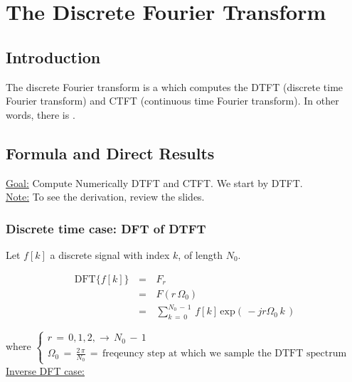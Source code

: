 \documentclass[12pt,a4paper]{book}
\begin{document}
\chapter{The Discrete Fourier Transform}

\section{Introduction}

The discrete Fourier transform is a  which computes the DTFT (discrete time Fourier transform) and CTFT (continuous time Fourier transform). In other words, there is .


\section{Formula and Direct Results}

\underline{Goal:} Compute Numerically DTFT and CTFT. We start by DTFT.\\

\underline{Note:} To see the derivation, review the slides.


\subsection{Discrete time case: DFT of DTFT}

Let $f[k]$ a discrete signal with index $k$, of length $N_0$.


\begin{equation}
\begin{array}{rcl}
\text{DFT}\{f[k]\} \, &=&\, F_r \\
						&=& \, F(r \, \Omega_0) \\
					   &=&\, \displaystyle\sum_{k \, = \, 0}^{N_0 \, - \, 1} \, f[k] \, \text{exp} \left(\, -j r \Omega_0 \, k   \,\right)
\end{array}
\label{Eq:DFT:dft_for_dtft}
\end{equation}
 
where $\begin{cases}
r \, = \, 0,1,2, \rightarrow \, N_0 \, - \, 1 \\
\Omega_0 \, = \,  \displaystyle\frac{2 \, \pi}{N_0} \, = \, \text{freqeuncy step at which we sample the DTFT spectrum}
\end{cases}$\\


\underline{Inverse DFT case:}\\
\end{document}
